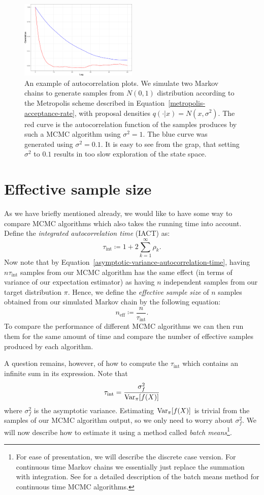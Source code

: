 \documentclass[report.tex]{subfiles}
\begin{document}
\begin{figure}
  \centering
  \includegraphics[width=0.5\textwidth]{img/appendix-autocorrelations-example}
  \caption{An example of autocorrelation plots. We simulate two Markov chains to generate
    samples from $N(0, 1)$ distribution according to the Metropolis scheme described in
    Equation~\ref{metropolis-acceptance-rate}, with proposal densities $q(\cdot \vert x) = N(x, \sigma^{2}).$
    The red curve is the autocorrelation function of the samples produces by such a MCMC
    algorithm using $\sigma^{2} = 1$.
    The blue curve was generated using $\sigma^{2} = 0.1$.
    It is easy to see from the grap, that
    setting $\sigma^{2}$ to $0.1$ results in too slow exploration of the state space.}
  \label{image-autocorrelation-function-example}
\end{figure}


\section{Effective sample size}
As we have briefly mentioned already, we would like to have some way to compare MCMC algorithms
which also takes the running time into account. Define the \textit{integrated autocorrelation time}
(IACT) as:
$$
\tau_{\text{int}} \coloneqq 1 + 2 \sum_{k = 1}^{\infty} \rho_{k}.
$$
Now note that by Equation~\ref{asymptotic-variance-autocorrelation-time},
having $n \tau_{\text{int}}$ samples from our MCMC algorithm has the same effect
(in terms of variance of our expectation estimator) as having $n$ independent samples
from our target distribution $\pi$.
Hence, we define the \textit{effective sample size} of $n$ samples obtained from our simulated
Markov chain by the following equation:
$$
n_{\text{eff}} \coloneqq \frac{n}{\tau_{\text{int}}}.
$$
To compare the performance of different MCMC algorithms we can then run them
for the same amount of time and compare the number of effective samples produced
by each algorithm.

A question remains, however, of how to compute the $\tau_{\text{int}}$ which contains
an infinite sum in its expression.
Note that
$$
\tau_{\text{int}} = \frac{\sigma_{f}^{2}}{\mathrm{Var}_{{\pi}}\!\left[{f(X)}\right]}
$$
where $\sigma_{f}^{2}$ is the asymptotic variance. Estimating
$\mathrm{Var}_{{\pi}}\!\left[{f(X)}\right]$ is trivial from the samples of our MCMC
algorithm output, so we only need to worry about $\sigma_{f}^{2}$. We will now
describe how to estimate it using a method called \textit{batch means}\footnote{
 For ease of presentation, we will describe the discrete case version.
 For continuous time Markov chains we essentially just
 replace the summation with integration. See \citet{bierkens2016zig} for a detailed
 description of the batch means method for continuous time MCMC algorithms.
}.
\end{document}
